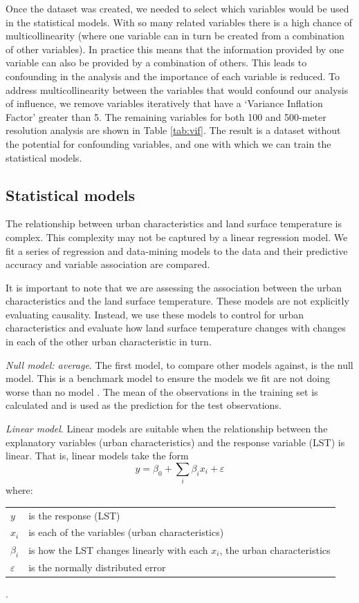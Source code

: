 \documentclass[final,3p,times,onecolumn,sort&compress]{elsarticle}
\makeatletter
\newenvironment{conditions}
  {\par\vspace{\abovedisplayskip}\noindent\begin{tabular}{>{$}l<{$} @{${}={}$} l}}
  {\end{tabular}\par\vspace{\belowdisplayskip}}
\makeatother
\begin{document}
Once the dataset was created, we needed to select which variables would be used in the statistical models.
With so many related variables there is a high chance of multicollinearity (where one variable can in turn be created from a combination of other variables).
In practice this means that the information provided by one variable can also be provided by a combination of others.
This leads to confounding in the analysis and the importance of each variable is reduced.
To address multicollinearity between the variables that would confound our analysis of influence, we remove variables iteratively that have a `Variance Inflation Factor' greater than 5.
The remaining variables for both 100 and 500-meter resolution analysis are shown in Table \ref{tab:vif}. 
The result is a dataset without the potential for confounding variables, and one with which we can train the statistical models.

\subsection{Statistical models}
\label{ss:models}
The relationship between urban characteristics and land surface temperature is complex.
This complexity may not be captured by a linear regression model. 
We fit a series of regression and data-mining models to the data and their predictive accuracy and variable association are compared.

It is important to note that we are assessing the association between the urban characteristics and the land surface temperature.
These models are not explicitly evaluating causality. 
Instead, we use these models to control for urban characteristics and evaluate how land surface temperature changes with changes in each of the other urban characteristic in turn.

\textit{Null model: average}. The first model, to compare other models against, is the null model. 
This is a benchmark model to ensure the models we fit are not doing worse than no model \cite{Shortridge2015-ub, Logan2016-if}.
The mean of the observations in the training set is calculated and is used as the prediction for the test observations.

\textit{Linear model}. Linear models are suitable when the relationship between the explanatory variables (urban characteristics) and the response variable (LST) is linear. 
That is, linear models take the form
\begin{equation}
    \label{eqn:linear}
    y = \beta_0 + \sum_i \beta_i x_i + \varepsilon
\end{equation}
where:
\begin{conditions}
    y & is the response (LST) \\
    x_i &  is each of the variables (urban characteristics) \\   
    \beta_i &  is how the LST changes linearly with each $x_i$, the urban characteristics \\   
    \varepsilon & is the normally distributed error
\end{conditions}
\cite{Nelder1972-tl}.
\end{document}
